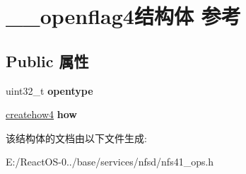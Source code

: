 \hypertarget{struct____openflag4}{}\section{\+\_\+\+\_\+openflag4结构体 参考}
\label{struct____openflag4}
\subsection*{Public 属性}
\begin{DoxyCompactItemize}
\item 
\mbox{\label{struct____openflag4_a6f9d91fc3e35f3cc62ef4a97ca8b988f}} 
uint32\+\_\+t {\bfseries opentype}
\item 
\mbox{\label{struct____openflag4_a1c4f520c8ca2bf51e2653d1d0d2cbc8c}} 
\hyperlink{struct____createhow4}{createhow4} {\bfseries how}
\end{DoxyCompactItemize}


该结构体的文档由以下文件生成\+:\begin{DoxyCompactItemize}
\item 
E\+:/\+React\+O\+S-\/0../base/services/nfsd/nfs41\+\_\+ops.\+h\end{DoxyCompactItemize}
